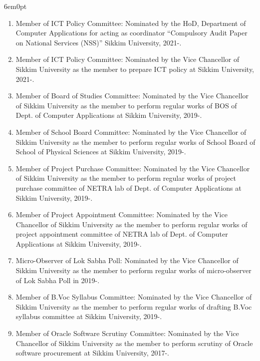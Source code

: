 \documentclass[11pt,a4paper]{moderncv}
\begin{document}
\begin{adjustwidth}{6em}{0pt}
\begin{enumerate}
		\item Member of ICT Policy Committee: Nominated by the HoD, Department of Computer Applications for acting as coordinator “Compulsory Audit Paper on National Services (NSS)” Sikkim University, 2021-.
		
		\item Member of ICT Policy Committee: Nominated by the Vice Chancellor of Sikkim University as the member to prepare ICT policy at Sikkim University, 2021-.
		
		\item Member of Board of Studies Committee: Nominated by the Vice Chancellor of Sikkim University as the member to perform regular works of BOS of Dept. of Computer Applications at Sikkim University, 2019-.
		
		\item Member of School Board Committee: Nominated by the Vice Chancellor of Sikkim University as the member to perform regular works of School Board of School of Physical Sciences at Sikkim University, 2019-.
		
		\item Member of Project Purchase Committee: Nominated by the Vice Chancellor of Sikkim University as the member to perform regular works of project purchase committee of NETRA lab of Dept. of Computer Applications at Sikkim University, 2019-.
		
		\item Member of Project Appointment Committee: Nominated by the Vice Chancellor of Sikkim University as the member to perform regular works of project appointment committee of NETRA lab of Dept. of Computer Applications at Sikkim University, 2019-.
		
		\item Micro-Observer of Lok Sabha Poll: Nominated by the Vice Chancellor of Sikkim University as the member to perform regular works of micro-observer of Lok Sabha Poll in 2019-.
		
		\item Member of B.Voc Syllabus Committee: Nominated by the Vice Chancellor of Sikkim University as the member to perform regular works of drafting B.Voc syllabus committee at Sikkim University, 2019-.
		
		\item Member of Oracle Software Scrutiny Committee: Nominated by the Vice Chancellor of Sikkim University as the member to perform scrutiny of Oracle software procurement at Sikkim University, 2017-.
		

\end{enumerate}
\end{adjustwidth}
\end{document}
